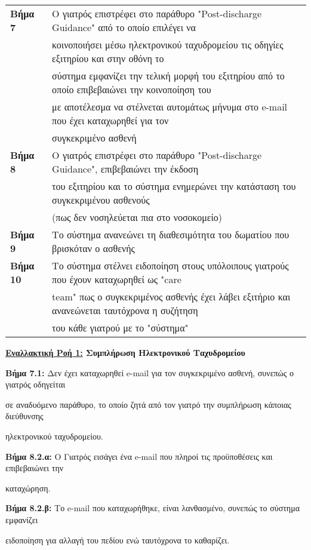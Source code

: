 \documentclass{article}
\newcommand\T{\rule{0pt}{2.6ex}}       %
\newcommand\B{\rule[-1.2ex]{0pt}{0pt}}
\begin{document}
\begin{center}
\begin{tabular}{|l|l|}
      \hline
      \textbf{Βήμα 7} & Ο γιατρός επιστρέφει στο παράθυρο "Post-discharge Guidance" από το οποίο επιλέγει να \T \\& κοινοποιήσει μέσω ηλεκτρονικού ταχυδρομείου τις οδηγίες εξιτηρίου και στην οθόνη το \\& σύστημα εμφανίζει την τελική μορφή του εξιτηρίου από το οποίο επιβεβαιώνει την κοινοποίηση του \\& με αποτέλεσμα να στέλνεται αυτομάτως μήνυμα στο e-mail που έχει καταχωρηθεί για τον \\& συγκεκριμένο ασθενή \B \\
      \hline
      \textbf{Βήμα 8} & Ο γιατρός επιστρέφει στο παράθυρο "Post-discharge Guidance", επιβεβαιώνει την  έκδοση \T \\& του εξιτηρίου και το σύστημα ενημερώνει την κατάσταση του συγκεκριμένου ασθενούς \\& (πως δεν νοσηλεύεται πια στο νοσοκομείο) \B \\   
      \hline
      \textbf{Βήμα 9} & Το σύστημα ανανεώνει τη διαθεσιμότητα του δωματίου που βρισκόταν ο ασθενής \T\B\\      
      \hline
      \textbf{Βήμα 10} & Το σύστημα στέλνει ειδοποίηση στους υπόλοιπους γιατρούς που έχουν καταχωρηθεί ως "care \T \\& team" πως ο συγκεκριμένος ασθενής έχει λάβει εξιτήριο και ανανεώνεται ταυτόχρονα η συζήτηση  \\& του κάθε γιατρού με το "σύστημα" \B \\
      \hline
     \end{tabular}
 \end{center}
 
 \newpage

\textbf{\underline{Εναλλακτική Ροή 1:} Συμπλήρωση Ηλεκτρονικού Ταχυδρομείου} \vspace{0.2cm}
\par \textbf{Βήμα 7.1:} Δεν έχει καταχωρηθεί e-mail για τον συγκεκριμένο ασθενή, συνεπώς ο γιατρός οδηγείται \par σε αναδυόμενο παράθυρο, το οποίο ζητά από τον γιατρό την συμπλήρωση κάποιας διεύθυνσης \par ηλεκτρονικού ταχυδρομείου.

\vspace{0.2cm}

\par \textbf{Βήμα 8.2.α:} Ο Γιατρός εισάγει ένα e-mail που πληροί τις προϋποθέσεις και επιβεβαιώνει την \par καταχώρηση. \vspace{0.2cm}
\par \textbf{Βήμα 8.2.β:} Το e-mail που καταχωρήθηκε, είναι λανθασμένο, συνεπώς το σύστημα εμφανίζει \par ειδοποίηση για αλλαγή του πεδίου ενώ ταυτόχρονα το καθαρίζει. \vspace{0.2cm}
\end{document}
